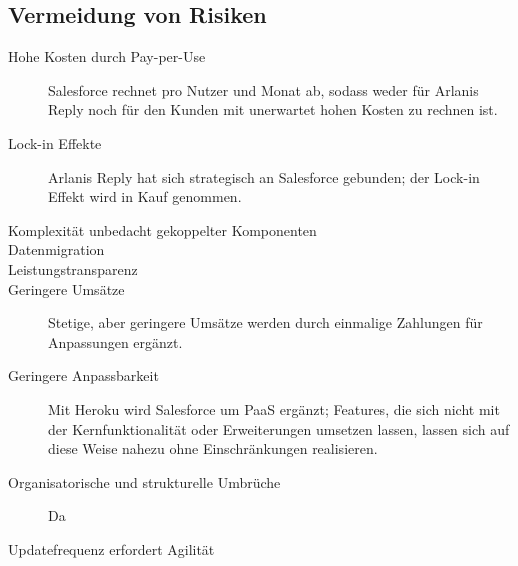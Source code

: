 \subsection{Vermeidung von Risiken}
\begin{description}
	\item[Hohe Kosten durch Pay-per-Use] Salesforce rechnet pro Nutzer und 
Monat ab, sodass weder für Arlanis Reply noch für den Kunden mit unerwartet 
hohen Kosten zu rechnen ist.
	\item[Lock-in Effekte] Arlanis Reply hat sich strategisch an Salesforce 
gebunden; der Lock-in Effekt wird in Kauf genommen.
	\item[Komplexität unbedacht gekoppelter Komponenten]
	\item[Datenmigration]
	\item[Leistungstransparenz]
	\item[Geringere Umsätze] Stetige, aber geringere Umsätze werden durch 
einmalige Zahlungen für Anpassungen ergänzt. 
	\item[Geringere Anpassbarkeit] Mit Heroku wird Salesforce um PaaS 
ergänzt; Features, die sich nicht mit der Kernfunktionalität oder Erweiterungen 
umsetzen lassen, lassen sich auf diese Weise nahezu ohne Einschränkungen 
realisieren.
	\item[Organisatorische und strukturelle Umbrüche] Da
	\item[Updatefrequenz erfordert Agilität] 
\end{description}

